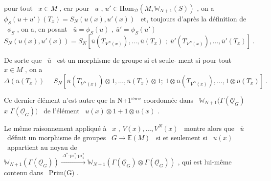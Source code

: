 
pour tout \ $x \in M$ , car pour \ $u$ , $u' \in \mathrm{Hom}_{\mathcal{D}}(M, \mathbb{W}_{N+1}(S))$ , on a
$\phi_S(u + u')(T_x) = S_N(u(x), u'(x))$ \ et, toujours d'après la définition
de \ $\phi_S$ , on a, en posant \ $\overline{u} = \phi_S(u)$ , $\overline{u}' = \phi_S(u')$
\[ S_N(u(x),u'(x)) = S_N[\overline{u}(T_{V^N(x)}),\dots,\overline{u}(T_x) \;;\; \overline{u}'(T_{V^N(x)}),\dots,\overline{u}'(T_x)] \ . \]

De sorte que \ $\overline{u}$ \ est un morphisme de groupe si et seule-%
ment si pour tout \ $x \in M$ , on a
\[ \Delta(\overline{u}(T_x)) = S_N[\overline{u}(T_{V^N(x)}) \otimes 1,\dots,\overline{u}(T_x) \otimes 1;\ 1 \otimes \overline{u}(T_{V^N(x)}),\dots,1 \otimes \overline{u}(T_x)] \ . \]

Ce dernier élément n'est autre que la N+1$^{\text{ième}}$ coordonnée
\margin{$\times$ \ $\otimes$} dans \ $\mathbb{W}_{N+1}(\Gamma(\underline{\mathcal{O}}_G)$ \hand{(}$x$\hand{)} $\Gamma(\underline{\mathcal{O}}_G))$ \ de l'élément \ $u(x) \otimes 1 + 1 \otimes u(x)$ .

Le même raisonnement appliqué à \ $x$ , $V(x),\dots,V^N(x)$ \ montre
alors que \ $\overline{u}$ \ définit un morphisme de groupes \ $G \to \mathbb{E}(M)$ \ si et seulement
si \ $u(x)$ \ appartient au noyau de \ $\mathbb{W}_{N+1}(\Gamma(\underline{\mathcal{O}}_G)) \xrightarrow{\ \Delta^*\text{-}\mathrm{pr}_1^*\text{-}\mathrm{pr}_2^*\ } \mathbb{W}_{N+1}(\Gamma(\underline{\mathcal{O}}_G) \otimes \Gamma(\underline{\mathcal{O}}_G))$ ,
qui est lui-même contenu dans \ Prim(G) .

